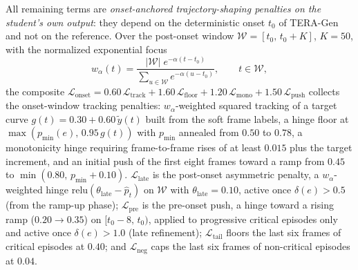 \documentclass[a4paper,fleqn]{cas-dc}
\newcommand{\TERAGen}{\mbox{TERA-Gen}\xspace}
\begin{document}
{All
remaining terms are \emph{onset-anchored trajectory-shaping penalties on the
student's own output}: they depend on the deterministic onset $t_0$ of
\TERAGen and not on the reference. Over the post-onset window
$\mathcal{W} = [t_0,\, t_0{+}K]$, $K{=}50$, with the normalized exponential
focus
\begin{equation}
  w_\alpha(t) = \frac{|\mathcal{W}|\;
    e^{-\alpha (t - t_0)}}{\sum_{u \in \mathcal{W}} e^{-\alpha (u - t_0)}},
  \qquad t \in \mathcal{W},
\label{eq:ponderacao_aftoi}
\end{equation}
the composite $\mathcal{L}_{\text{onset}} = 0.60\,\mathcal{L}_{\text{track}} +
1.60\,\mathcal{L}_{\text{floor}} + 1.20\,\mathcal{L}_{\text{mono}} +
1.50\,\mathcal{L}_{\text{push}}$ collects the onset-window tracking penalties:
$w_\alpha$-weighted squared tracking of a target curve
$g(t) = 0.30 + 0.60\,\tilde{y}(t)$ built from the soft frame labels, a hinge
floor at $\max(p_{\min}(e),\, 0.95\,g(t))$ with $p_{\min}$ annealed from
$0.50$ to $0.78$, a monotonicity hinge requiring frame-to-frame rises of at
least $0.015$ plus the target increment, and an initial push of the first
eight frames toward a ramp from $0.45$ to $\min(0.80,\, p_{\min}{+}0.10)$.
$\mathcal{L}_{\text{late}}$ is the post-onset asymmetric penalty, a
$w_\alpha$-weighted hinge $\mathrm{relu}(\theta_{\text{late}} - \hat{p}_t)$ on
$\mathcal{W}$ with $\theta_{\text{late}}{=}0.10$, active once
$\delta(e) > 0.5$ (from the ramp-up phase);
$\mathcal{L}_{\text{pre}}$ is the pre-onset push, a hinge toward a rising ramp
($0.20 \rightarrow 0.35$) on $[t_0{-}8,\, t_0)$, applied to progressive
critical episodes only and active once $\delta(e) > 1.0$ (late refinement); $\mathcal{L}_{\text{tail}}$ floors the last six frames
of critical episodes at $0.40$; and $\mathcal{L}_{\text{neg}}$ caps the last
six frames of non-critical episodes at $0.04$.

}
\end{document}
